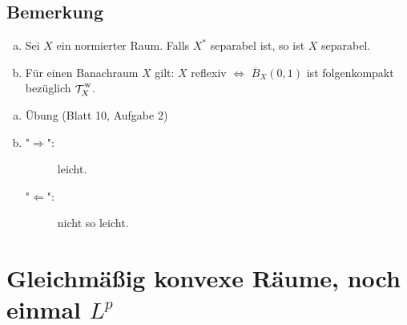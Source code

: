 \subsection[Bemerkung: $X$ separabel, wenn $X^*$ separabel, Reflexiviät von Banachräumen]{Bemerkung} %
\label{sub:519}
\begin{enumerate}[a)]
	\item Sei $X$ ein normierter Raum. Falls $X^*$ separabel ist, so ist $X$ separabel.
	\item Für einen Banachraum $X$ gilt: $X$ reflexiv $\iff$ $\overline{B}_X(0,1)$ ist folgenkompakt bezüglich $\weakT{X}$.
\end{enumerate}
\begin{enumerate}[a)]
	\item Übung (Blatt 10, Aufgabe 2)
	\item \begin{description}
		\item["$\Rightarrow$":] leicht.
		\item["$\Leftarrow$":] nicht so leicht. \bewende
	\end{description}
\end{enumerate}
\newpage

\section{Gleichmäßig konvexe Räume, noch einmal $L^p$} %
\label{sec:6}


